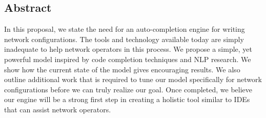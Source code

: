 \subsection*{Abstract}
In this proposal, we state the need for an auto-completion engine for writing network configurations. The tools and technology available today are simply inadequate to help network operators in this process. We propose a simple, yet powerful model inspired by code completion techniques and NLP research. We show how the current state of the model gives encouraging results. We also outline additional work that is required to tune our model specifically for network configurations before we can truly realize our goal. Once completed, we believe our engine will be a strong first step in creating a holistic tool similar to IDEs that can assist network operators. 
